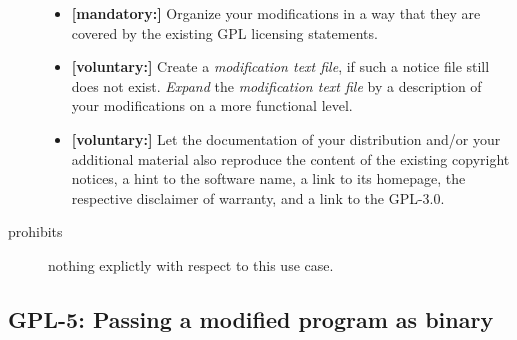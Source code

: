 \begin{description}
\begin{itemize}
  \item \textbf{[mandatory:]} Organize your modifications in a way that they are
  covered by the existing GPL licensing statements.
  
  \item \textbf{[voluntary:]} Create a \emph{modification text file}, if such a
  notice file still does not exist. \emph{Expand} the \emph{modification text
  file} by a description of your modifications on a more functional level.
    
  \item \textbf{[voluntary:]} Let the documentation of your distribution and/or
  your additional material also reproduce the content of the existing
  copyright notices, a hint to the software name, a link to its homepage,
  the respective disclaimer of warranty, and a link to the GPL-3.0.
  
 \end{itemize}
 
\item[prohibits] nothing explictly with respect to this use case.

\end{description}

\subsection{GPL-5: Passing a modified program as binary}
\label{OSUC-04B-GPL}

